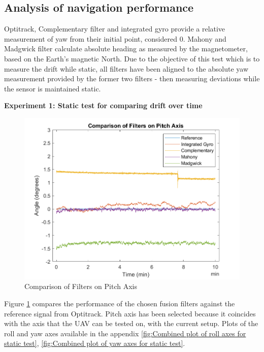 \subsection{Analysis of navigation performance}

Optitrack, Complementary filter and integrated gyro provide a relative measurement of yaw from their initial point, considered 0.
Mahony and Madgwick filter calculate absolute heading as measured by the magnetometer, based on the Earth's magnetic North. 
Due to the objective of this test which is to measure the drift while static, all filters have been aligned to the absolute yaw measurement provided by the former two filters - then measuring deviations while the sensor is maintained static. 

\textbf{Experiment 1: Static test for comparing drift over time}

\begin{figure}[H]
    \centering
    \includegraphics[scale=1]{graphics/Navigation/CombinedStaticPitch.png}
    \caption{Comparison of Filters on Pitch Axis}
     \label{fig:Comparison of Filters on Pitch Axis}
\end{figure} 

Figure \ref{fig:Comparison of Filters on Pitch Axis} compares the performance of the chosen fusion filters against the reference signal from Optitrack. Pitch axis has been selected because it coincides with the axis that the UAV can be tested on, with the current setup. Plots of the roll and yaw axes available in the appendix \ref{fig:Combined plot of roll axes for static test}, \ref{fig:Combined plot of yaw axes for static test}.

